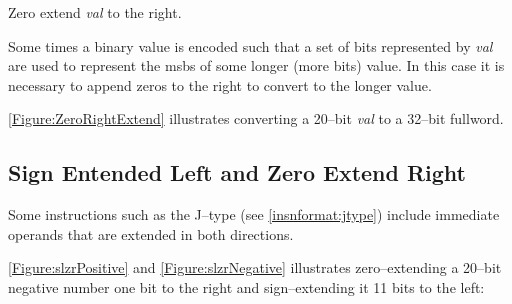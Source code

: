 Zero extend {\em val} to the right.

Some times a binary value is encoded such that a set of bits represented
by {\em val} are used to represent the \acrshort{msb}s of some longer (more bits) 
value.  
In this case it is necessary to append zeros to the right to convert \verb@val@ to 
the longer value.

\autoref{Figure:ZeroRightExtend} illustrates converting a 20--bit {\em val} to
a 32--bit fullword.

\begin{figure}[ht]
\centering
{}
\label{Figure:ZeroRightExtend}
\end{figure}



\subsection{Sign Entended Left and Zero Extend Right}
\label{extension:slzr}

Some instructions such as the J--type (see \autoref{insnformat:jtype}) include
immediate operands that are extended in both directions.

\autoref{Figure:slzrPositive} and \autoref{Figure:slzrNegative}
illustrates zero--extending a 20--bit negative number one bit to the right 
and sign--extending it 11 bits to the left:

\begin{figure}[ht]
\centering
{}
\label{Figure:slzrPositive}
\end{figure}

\begin{figure}[ht]
\centering
{}
\label{Figure:slzrNegative}
\end{figure}


